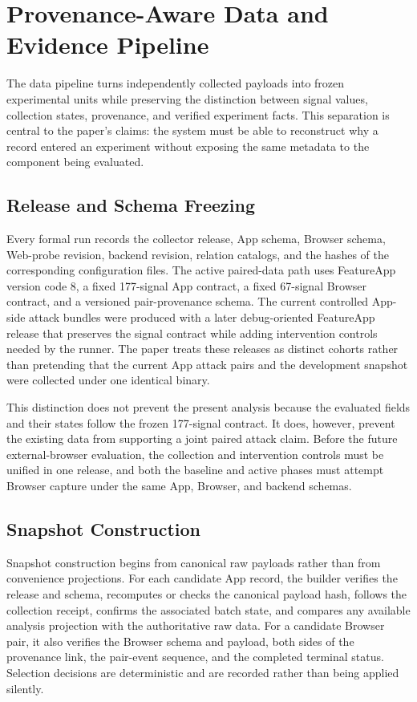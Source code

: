 \section{Provenance-Aware Data and Evidence Pipeline}
\label{sec:evidence}

The data pipeline turns independently collected payloads into frozen experimental units while preserving the distinction between signal values, collection states, provenance, and verified experiment facts. This separation is central to the paper's claims: the system must be able to reconstruct why a record entered an experiment without exposing the same metadata to the component being evaluated.

\subsection{Release and Schema Freezing}

Every formal run records the collector release, App schema, Browser schema, Web-probe revision, backend revision, relation catalogs, and the hashes of the corresponding configuration files. The active paired-data path uses FeatureApp version code 8, a fixed 177-signal App contract, a fixed 67-signal Browser contract, and a versioned pair-provenance schema. The current controlled App-side attack bundles were produced with a later debug-oriented FeatureApp release that preserves the \appfp signal contract while adding intervention controls needed by the runner. The paper treats these releases as distinct cohorts rather than pretending that the current App attack pairs and the development \pairedfp snapshot were collected under one identical binary.

This distinction does not prevent the present \appfp analysis because the evaluated fields and their states follow the frozen 177-signal contract. It does, however, prevent the existing data from supporting a joint paired attack claim. Before the future external-browser evaluation, the collection and intervention controls must be unified in one release, and both the baseline and active phases must attempt Browser capture under the same App, Browser, and backend schemas.

\subsection{Snapshot Construction}

Snapshot construction begins from canonical raw payloads rather than from convenience projections. For each candidate App record, the builder verifies the release and schema, recomputes or checks the canonical payload hash, follows the collection receipt, confirms the associated batch state, and compares any available analysis projection with the authoritative raw data. For a candidate Browser pair, it also verifies the Browser schema and payload, both sides of the provenance link, the pair-event sequence, and the completed terminal status. Selection decisions are deterministic and are recorded rather than being applied silently.

